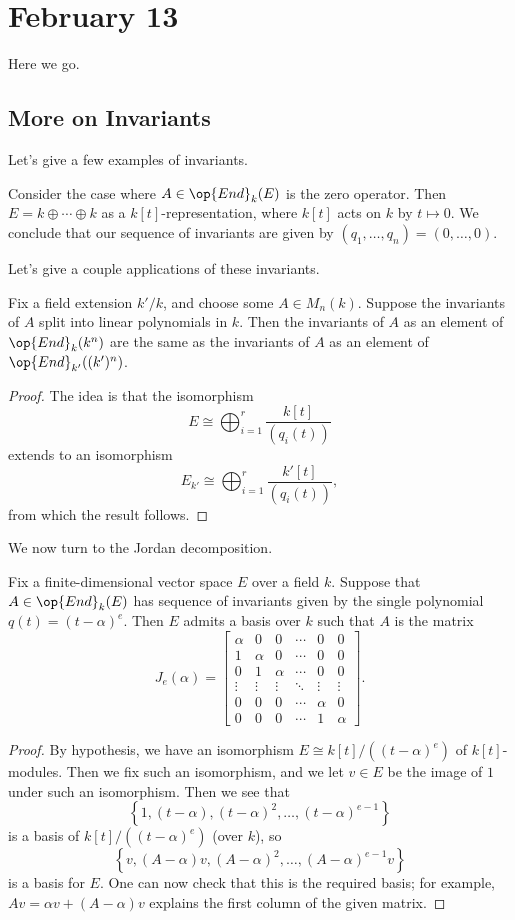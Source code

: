 \documentclass[../notes.tex]{subfiles}
\begin{document}
\section{February 13}
Here we go.

\subsection{More on Invariants}
Let's give a few examples of invariants.
\begin{example}
	Consider the case where $A\in\op{End}_k(E)$ is the zero operator. Then $E=k\oplus\cdots\oplus k$ as a $k[t]$-representation, where $k[t]$ acts on $k$ by $t\mapsto0$. We conclude that our sequence of invariants are given by $(q_1,\ldots,q_n)=(0,\ldots,0)$.
\end{example}
Let's give a couple applications of these invariants.
\begin{corollary}
	Fix a field extension $k'/k$, and choose some $A\in M_n(k)$. Suppose the invariants of $A$ split into linear polynomials in $k$. Then the invariants of $A$ as an element of $\op{End}_k(k^n)$ are the same as the invariants of $A$ as an element of $\op{End}_{k'}((k')^n)$.
\end{corollary}
\begin{proof}
	The idea is that the isomorphism
	\[E\cong\bigoplus_{i=1}^r\frac{k[t]}{(q_i(t))}\]
	extends to an isomorphism
	\[E_{k'}\cong\bigoplus_{i=1}^r\frac{k'[t]}{(q_i(t))},\]
	from which the result follows.
\end{proof}
We now turn to the Jordan decomposition.
\begin{theorem} \label{thm:one-jordan-block}
	Fix a finite-dimensional vector space $E$ over a field $k$. Suppose that $A\in\op{End}_k(E)$ has sequence of invariants given by the single polynomial $q(t)=(t-\alpha)^e$. Then $E$ admits a basis over $k$ such that $A$ is the matrix
	\[J_e(\alpha)=\begin{bmatrix}
		\alpha & 0 & 0 & \cdots & 0 & 0 \\
		1 & \alpha & 0 & \cdots & 0 & 0 \\
		0 & 1 & \alpha & \cdots & 0 & 0 \\
		\vdots & \vdots & \vdots & \ddots & \vdots & \vdots \\
		0 & 0 & 0 & \cdots & \alpha & 0 \\
		0 & 0 & 0 & \cdots & 1 & \alpha
	\end{bmatrix}.\]
\end{theorem}
\begin{proof}
	By hypothesis, we have an isomorphism $E\cong k[t]/\left((t-\alpha)^e\right)$ of $k[t]$-modules. Then we fix such an isomorphism, and we let $v\in E$ be the image of $1$ under such an isomorphism. Then we see that
	\[\left\{1,(t-\alpha),(t-\alpha)^2,\ldots,(t-\alpha)^{e-1}\right\}\]
	is a basis of $k[t]/\left((t-\alpha)^e\right)$ (over $k$), so
	\[\left\{v,(A-\alpha)v,(A-\alpha)^2,\ldots,(A-\alpha)^{e-1}v\right\}\]
	is a basis for $E$. One can now check that this is the required basis; for example, $Av=\alpha v+(A-\alpha)v$ explains the first column of the given matrix.
\end{proof}
\end{document}
